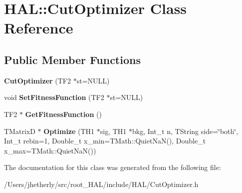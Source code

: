 \hypertarget{class_h_a_l_1_1_cut_optimizer}{\section{H\+A\+L\+:\+:Cut\+Optimizer Class Reference}
\label{class_h_a_l_1_1_cut_optimizer}
}
\subsection*{Public Member Functions}
\begin{DoxyCompactItemize}
\item 
\hypertarget{class_h_a_l_1_1_cut_optimizer_a7f1be065a4ec07a1e8cfee59dc0b80d1}{{\bfseries Cut\+Optimizer} (T\+F2 $\ast$st=N\+U\+L\+L)}\label{class_h_a_l_1_1_cut_optimizer_a7f1be065a4ec07a1e8cfee59dc0b80d1}

\item 
\hypertarget{class_h_a_l_1_1_cut_optimizer_a89082c3ec2719462ba90b3677119a1c6}{void {\bfseries Set\+Fitness\+Function} (T\+F2 $\ast$st=N\+U\+L\+L)}\label{class_h_a_l_1_1_cut_optimizer_a89082c3ec2719462ba90b3677119a1c6}

\item 
\hypertarget{class_h_a_l_1_1_cut_optimizer_a35eab754a13b06da0526fdf9900cc6eb}{T\+F2 $\ast$ {\bfseries Get\+Fitness\+Function} ()}\label{class_h_a_l_1_1_cut_optimizer_a35eab754a13b06da0526fdf9900cc6eb}

\item 
\hypertarget{class_h_a_l_1_1_cut_optimizer_a7055834b45ab96cbe30d335f7cd6f26d}{T\+Matrix\+D $\ast$ {\bfseries Optimize} (T\+H1 $\ast$sig, T\+H1 $\ast$bkg, Int\+\_\+t n, T\+String side=\char`\"{}both\char`\"{}, Int\+\_\+t rebin=1, Double\+\_\+t x\+\_\+min=T\+Math\+::\+Quiet\+Na\+N(), Double\+\_\+t x\+\_\+max=T\+Math\+::\+Quiet\+Na\+N())}\label{class_h_a_l_1_1_cut_optimizer_a7055834b45ab96cbe30d335f7cd6f26d}

\end{DoxyCompactItemize}


The documentation for this class was generated from the following file\+:\begin{DoxyCompactItemize}
\item 
/\+Users/jhetherly/src/root\+\_\+\+H\+A\+L/include/\+H\+A\+L/Cut\+Optimizer.\+h\end{DoxyCompactItemize}
